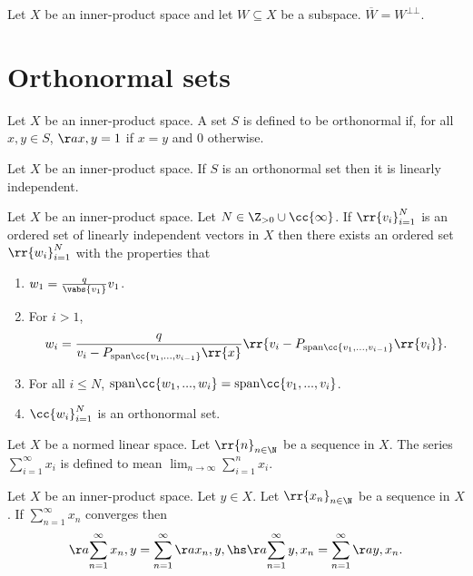 \documentclass{article}
\begin{document}
\begin{theorem}
  Let $X$ be an inner-product space and let $W\subseteq X$ be a subspace. $\overline W = W^{\bot\bot}$.
\end{theorem}

\section{Orthonormal sets}\label{sec:orthonormal-sets}

\begin{definition}
  Let $X$ be an inner-product space. A set $S$ is defined to be orthonormal if, for all
  $x,y\in S$, $\aa{x,y}=1$ if $x=y$ and $0$ otherwise.
\end{definition}

\begin{lemma}
  Let $X$ be an inner-product space. If $S$ is an orthonormal set then it is linearly
  independent.
\end{lemma}

\begin{theorem}
  Let $X$ be an inner-product space. Let $N\in\Z_{>0}\cup \cc{\infty}$. If $\rr{v_i}_{i=1}^N$
  is an ordered set of linearly independent vectors in $X$ then there exists an ordered set
  $\rr{w_i}_{i=1}^N$ with the properties that
  \begin{enumerate}
    \item $w_1=\frac{q}{\vabs{v_1}}v_1$.
    \item For $i>1$, \begin{align*}
        w_i = \frac{q}{v_i-P_{\text{span}\cc{v_1,...,v_{i-1}}}\rr{x}}\rr{v_i-P_{\text{span}\cc{v_1,...,v_{i-1}}}\rr{v_i}}.
      \end{align*}
    \item For all $i\leq N$, $\text{span}\cc{w_1,...,w_i}=\text{span}\cc{v_1,...,v_i}$.
    \item $\cc{w_i}_{i=1}^N$ is an orthonormal set.
  \end{enumerate}
\end{theorem}

\begin{definition}
  Let $X$ be a normed linear space. Let $\rr{n}_{n\in\N}$ be a sequence in $X$. The
  series $\sum_{i=1}^{\infty} x_i$ is defined to mean $\lim_{n\to\infty}\sum_{i=1}^{n} x_i$.
\end{definition}

\begin{lemma}
  Let $X$ be an inner-product space. Let $y\in X$. Let $\rr{x_n}_{n\in\N}$ be a sequence
  in $X$. If $\sum_{n=1}^{\infty} x_n$ converges then
  \begin{align*}
    \aa{\sum_{n=1}^{\infty} x_n,y}=\sum_{n=1}^{\infty} \aa{x_n,y}, \hs
    \aa{\sum_{n=1}^{\infty} y,x_n}=\sum_{n=1}^{\infty} \aa{y,x_n}.
  \end{align*}
\end{lemma}
\end{document}
